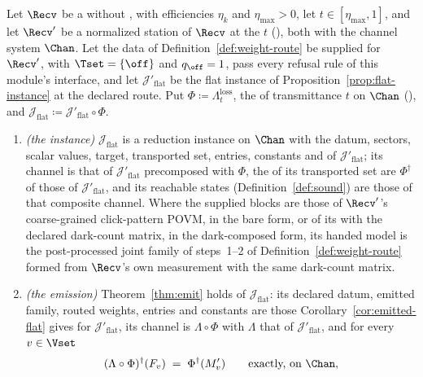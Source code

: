 \begin{corollary}\label{cor:normalized-flat}
Let $\Recv$ be a  without , with
efficiencies $\eta_k$ and $\eta_{\max}>0$, let $t\in[\eta_{\max},1]$, and let
$\Recv'$ be a normalized station of $\Recv$ at the
 $t$
(), both with
the channel system $\Chan$. Let the data of
Definition~\ref{def:weight-route} be supplied for $\Recv'$, with
$\Tset=\{\off\}$ and $q_{\off}=1$, pass every refusal rule of this module's
interface, and let $\mathcal{J}'_{\mathrm{flat}}$ be the flat instance of
Proposition~\ref{prop:flat-instance} at the declared route. Put
$\Phi\coloneqq\Lambda^{\mathrm{loss}}_t$, the  of
transmittance $t$ on $\Chan$
(), and
$\mathcal{J}_{\mathrm{flat}}\coloneqq\mathcal{J}'_{\mathrm{flat}}\circ\Phi$.
\begin{enumerate}[label=(\roman*),leftmargin=3.0em]
\item \emph{(the instance)} $\mathcal{J}_{\mathrm{flat}}$ is a reduction
  instance on $\Chan$ with the datum, sectors, scalar values, target,
  transported set, entries, constants and  of
  $\mathcal{J}'_{\mathrm{flat}}$; its channel is that of
  $\mathcal{J}'_{\mathrm{flat}}$ precomposed with $\Phi$, the
   of its transported set are $\Phi^{\dagger}$ of
  those of $\mathcal{J}'_{\mathrm{flat}}$, and its reachable states
  (Definition~\ref{def:sound}) are those of that composite channel. Where the supplied blocks are those of
  $\Recv'$'s coarse-grained click-pattern POVM, in the bare form, or of its
   with the declared dark-count matrix, in the
  dark-composed form, its handed model is the post-processed joint family of
  steps~1--2 of Definition~\ref{def:weight-route} formed from $\Recv$'s own
  measurement with the same dark-count matrix.
\item \emph{(the emission)} Theorem~\ref{thm:emit} holds of
  $\mathcal{J}_{\mathrm{flat}}$: its declared datum, emitted family, routed
  weights, entries and constants are those Corollary~\ref{cor:emitted-flat}
  gives for $\mathcal{J}'_{\mathrm{flat}}$, its channel is
  $\Lambda\circ\Phi$ with $\Lambda$ that of $\mathcal{J}'_{\mathrm{flat}}$,
  and for every $v\in\Vset$
  \begin{equation}\label{eq:normalized-flat}
    (\Lambda\circ\Phi)^{\dagger}(F_v)\;=\;\Phi^{\dagger}(M'_v)
    \qquad\text{exactly, on }\Chan,

\end{equation}
\end{enumerate}
\end{corollary}
